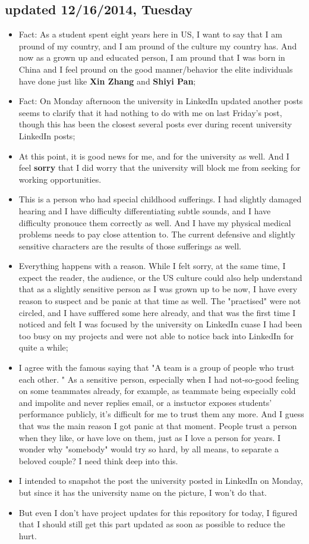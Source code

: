 \documentclass[9pt,b5paper]{article}
\begin{document}
\subsection{updated 12/16/2014, Tuesday}
\label{sec-9-2}
\begin{itemize}
\item Fact: As a student spent eight years here in US, I want to say that I am pround of my country, and I am pround of the culture my country has. And now as a grown up and educated person, I am pround that I was born in China and I feel pround on the good manner/behavior the elite individuals have done just like \textbf{Xin Zhang} and \textbf{Shiyi Pan};
\item Fact: On Monday afternoon the university in LinkedIn updated another posts seems to clarify that it had nothing to do with me on last Friday's post, though this has been the closest several posts ever during recent university LinkedIn posts;
\item At this point, it is good news for me, and for the university as well. And I feel \textbf{sorry} that I did worry that the university will block me from seeking for working opportunities.
\item This is a person who had special childhood sufferings. I had slightly damaged hearing and I have difficulty differentiating subtle sounds, and I have difficulty pronouce them correctly as well. And I have my physical medical problems needs to pay close attention to. The current defensive and slightly sensitive characters are the results of those sufferings as well.
\item Everything happens with a reason. While I felt sorry, at the same time, I expect the reader, the audience, or the US culture could also help understand that as a slightly sensitive person as I was grown up to be now, I have every reason to suspect and be panic at that time as well. The "practised" were not circled, and I have sufffered some here already, and that was the first time I noticed and felt I was focused by the university on LinkedIn cuase I had been too busy on my projects and were not able to notice back into LinkedIn for quite a while;
\item I agree with the famous saying that "A team is a group of people who trust each other. " As a sensitive person, especially when I had not-so-good feeling on some teammates already, for example, as teammate being especially cold and impolite and never replies email, or a instuctor exposes students' performance publicly, it's difficult for me to trust them any more. And I guess that was the main reason I got panic at that moment. People trust a person when they like, or have love on them, just as I love a person for years. I wonder why "somebody" would try so hard, by all means, to separate a beloved couple? I need think deep into this.
\item I intended to snapshot the post the university posted in LinkedIn on Monday, but since it has the university name on the picture, I won't do that.
\item But even I don't have project updates for this repository for today, I figured that I should still get this part updated as soon as possible to reduce the hurt.
\end{itemize}
\end{document}
